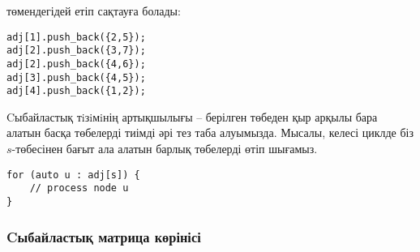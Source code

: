 \begin{center}
\end{center}
төмендегідей етіп сақтауға болады:
\begin{lstlisting}
adj[1].push_back({2,5});
adj[2].push_back({3,7});
adj[2].push_back({4,6});
adj[3].push_back({4,5});
adj[4].push_back({1,2});
\end{lstlisting}

Cыбайластық тiзiмiнің артықшылығы -- берілген төбеден қыр арқылы бара алатын басқа төбелерді тиімді әрі тез таба алуымызда. 
Мысалы, келесі циклде біз $s$-төбесінен бағыт ала алатын барлық төбелерді өтіп шығамыз.

\begin{lstlisting}
for (auto u : adj[s]) {
    // process node u
}
\end{lstlisting}

\subsubsection{Cыбайластық матрица көрінісі}



